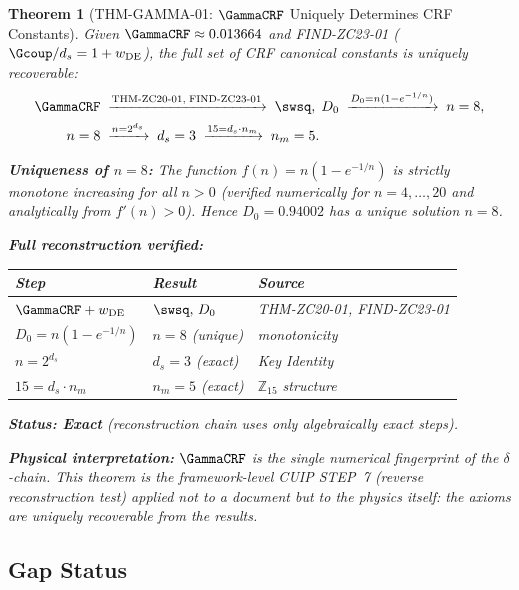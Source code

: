\documentclass[12pt, a4paper]{article}
\newtheorem{theorem}{Theorem}[section]
\begin{document}
\begin{theorem}[THM-GAMMA-01: $\GammaCRF$ Uniquely Determines
  CRF Constants]
\label{thm:gamma}
Given $\GammaCRF \approx 0.013664$ and FIND-ZC23-01
($\Gcoup/d_s = 1 + w_{\rm DE}$), the full set of CRF canonical
constants is uniquely recoverable:
\begin{align*}
  \GammaCRF
  &\;\xrightarrow{\rm THM\text{-}ZC20\text{-}01,\; FIND\text{-}ZC23\text{-}01}\;
  \swsq,\; D_0
  \;\xrightarrow{D_0 = n(1-e^{-1/n})}\;
  n = 8,\\
  n = 8
  &\;\xrightarrow{n = 2^{d_s}}\;
  d_s = 3
  \;\xrightarrow{15 = d_s \cdot n_m}\;
  n_m = 5.
\end{align*}

\medskip\noindent\textbf{Uniqueness of $n = 8$:}
The function $f(n) = n(1-e^{-1/n})$ is strictly monotone increasing
for all $n > 0$ (verified numerically for $n = 4,\ldots,20$
and analytically from $f'(n) > 0$).
Hence $D_0 = 0.94002$ has a unique solution $n = 8$.

\medskip\noindent\textbf{Full reconstruction verified:}
\begin{center}
\renewcommand{\arraystretch}{1.3}
\small
\begin{tabular}{lll}
\toprule
Step & Result & Source \\
\midrule
$\GammaCRF + w_{\rm DE}$        & $\swsq,\, D_0$ & THM-ZC20-01, FIND-ZC23-01 \\
$D_0 = n(1-e^{-1/n})$           & $n = 8$ (unique) & monotonicity \\
$n = 2^{d_s}$                   & $d_s = 3$ (exact) & Key Identity \\
$15 = d_s \cdot n_m$            & $n_m = 5$ (exact) & $\mathbb{Z}_{15}$ structure \\
\bottomrule
\end{tabular}
\end{center}

\medskip\noindent\textbf{Status: Exact}
(reconstruction chain uses only algebraically exact steps).

\medskip\noindent\textbf{Physical interpretation:}
$\GammaCRF$ is the single numerical fingerprint of the
$\delta$-chain.
This theorem is the framework-level CUIP STEP~7 (reverse
reconstruction test) applied not to a document but to the
physics itself: the axioms are uniquely recoverable from the
results.
\end{theorem}

\subsection{Gap Status}
\label{sec:gap}
\end{document}
